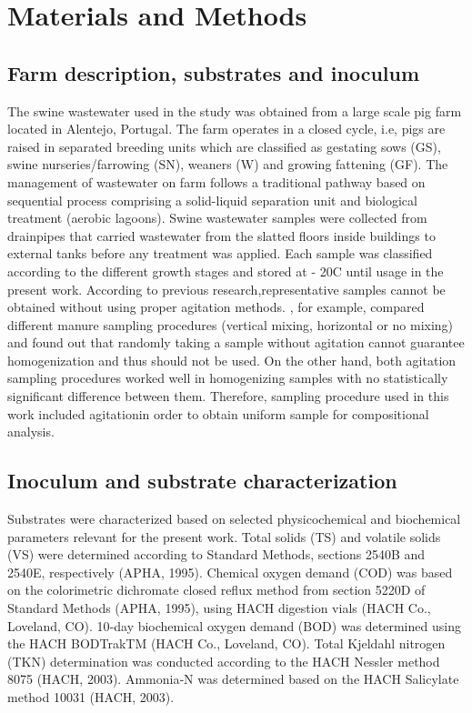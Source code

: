 \section{Materials and Methods}
\subsection{Farm description, substrates and inoculum}
The swine wastewater used in the study was obtained from a large scale pig farm located in Alentejo, Portugal. The farm operates in a closed cycle, i.e, pigs are raised in separated breeding units which are classified as gestating sows (GS), swine nurseries/farrowing (SN), weaners (W) and growing fattening (GF). The management of wastewater on farm follows a traditional pathway based on sequential process comprising a solid-liquid separation unit and biological treatment (aerobic lagoons). Swine wastewater samples were collected from drainpipes that carried wastewater from the slatted floors inside buildings to external tanks before any treatment was applied. Each sample was classified according to the different growth stages and stored at - 20\textdegree C until usage in the present work. According to previous research,representative samples cannot be obtained without using proper agitation methods. \cite{Zhu_2004}, for example, compared different manure sampling procedures (vertical mixing, horizontal or no mixing) and found out that randomly taking a sample without agitation cannot guarantee homogenization and thus should not be used. On the other hand, both agitation sampling procedures worked well in homogenizing samples with no statistically significant difference between them.  Therefore, sampling procedure used in this work included agitationin order to obtain  uniform sample for compositional analysis.
\subsection{Inoculum and substrate characterization}
Substrates were characterized based on selected physicochemical and biochemical parameters relevant for the present work. Total solids (TS) and volatile solids (VS) were determined according to Standard Methods, sections 2540B and 2540E, respectively (APHA, 1995). Chemical oxygen demand (COD) was based on the colorimetric dichromate closed reflux method from section 5220D of Standard Methods (APHA, 1995), using HACH digestion vials (HACH Co., Loveland, CO). 10‐day biochemical oxygen demand (BOD) was determined using the HACH BODTrakTM (HACH Co., Loveland, CO). Total Kjeldahl nitrogen (TKN) determination was conducted according to the HACH Nessler method 8075 (HACH, 2003). Ammonia‐N was determined based on the HACH Salicylate method 10031 (HACH, 2003). 
